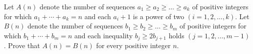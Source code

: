 Let $A(n)$ denote the number of sequences $a_1\ge a_2\ge\ldots\ge a_k$ of positive integers for which $a_1+\cdots+a_k = n$ and each $a_i +1$ is a power of two $(i = 1,2,\ldots,k)$. Let $B(n)$ denote the number of sequences $b_1\ge b_2\ge\ldots\ge b_m$ of positive integers for which $b_1+\cdots+b_m =n$ and each inequality $b_j\ge 2b_{j+1}$ holds $(j=1,2,\ldots, m-1)$. Prove that $A(n) = B(n)$ for every positive integer $n$.
